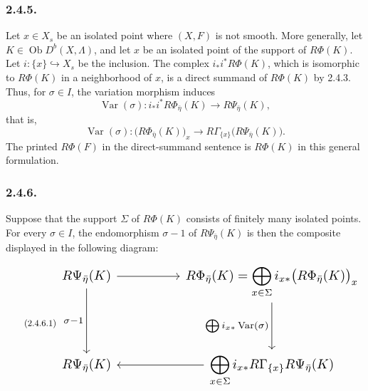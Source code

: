 \subsubsection*{2.4.5.}
Let $x\in X_s$ be an isolated point where $(X,F)$ is not smooth.
More generally, let $K\in\operatorname{Ob}D^b(X,\Lambda)$, and let
$x$ be an isolated point of the support of $R\Phi(K)$.  Let
$i:\{x\}\hookrightarrow X_s$ be the inclusion.  The complex
$i_*i^*R\Phi(K)$, which is isomorphic to $R\Phi(K)$ in a neighborhood
of $x$, is a direct summand of $R\Phi(K)$ by 2.4.3.  Thus, for
$\sigma\in I$, the variation morphism induces
\[
\operatorname{Var}(\sigma):
i_*i^*R\Phi_{\bar\eta}(K)\longrightarrow R\Psi_{\bar\eta}(K),
\]
that is,
\begin{equation}\tag{2.4.5.1}
\operatorname{Var}(\sigma):
\bigl(R\Phi_{\bar\eta}(K)\bigr)_x
\longrightarrow
R\Gamma_{\{x\}}\bigl(R\Psi_{\bar\eta}(K)\bigr).
\end{equation}
The printed $R\Phi(F)$ in the direct-summand sentence is
$R\Phi(K)$ in this general formulation.

\subsubsection*{2.4.6.}
Suppose that the support $\Sigma$ of $R\Phi(K)$ consists of finitely
many isolated points.  For every $\sigma\in I$, the endomorphism
$\sigma-1$ of $R\Psi_{\bar\eta}(K)$ is then the composite displayed
in the following diagram:
\begin{equation}\tag{2.4.6.1}
\resizebox{\textwidth}{!}{%
\begin{tikzcd}[ampersand replacement=\&, column sep=huge, row sep=huge]
R\Psi_{\bar\eta}(K)
  \arrow[r] \arrow[d, "\sigma-1"']
  \& R\Phi_{\bar\eta}(K)
     =\displaystyle\bigoplus_{x\in\Sigma}
       i_{x*}\bigl(R\Phi_{\bar\eta}(K)\bigr)_x
     \arrow[d, "{\bigoplus i_{x*}\operatorname{Var}(\sigma)}"'] \\
R\Psi_{\bar\eta}(K)
  \& \displaystyle\bigoplus_{x\in\Sigma}
       i_{x*}R\Gamma_{\{x\}}R\Psi_{\bar\eta}(K)
     \arrow[l]
\end{tikzcd}}
\end{equation}

